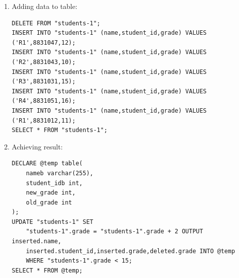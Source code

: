 \documentclass{article}
\begin{document}
\begin{enumerate}
		\begin{enumerate}
			\item Adding data to table:
				\begin{verbatim}
DELETE FROM "students-1";
INSERT INTO "students-1" (name,student_id,grade) VALUES ('R1',8831047,12);
INSERT INTO "students-1" (name,student_id,grade) VALUES ('R2',8831043,10);
INSERT INTO "students-1" (name,student_id,grade) VALUES ('R3',8831031,15);
INSERT INTO "students-1" (name,student_id,grade) VALUES ('R4',8831051,16);
INSERT INTO "students-1" (name,student_id,grade) VALUES ('R1',8831012,11);
SELECT * FROM "students-1";
				\end{verbatim}
			\item Achieving result:
				\begin{verbatim}
DECLARE @temp table(
	nameb varchar(255),
	student_idb int,
	new_grade int,
	old_grade int
);
UPDATE "students-1" SET 
	"students-1".grade = "students-1".grade + 2 OUTPUT inserted.name,
	inserted.student_id,inserted.grade,deleted.grade INTO @temp
	WHERE "students-1".grade < 15;
SELECT * FROM @temp;
				\end{verbatim}
		\end{enumerate}
\end{enumerate}
\end{document}
